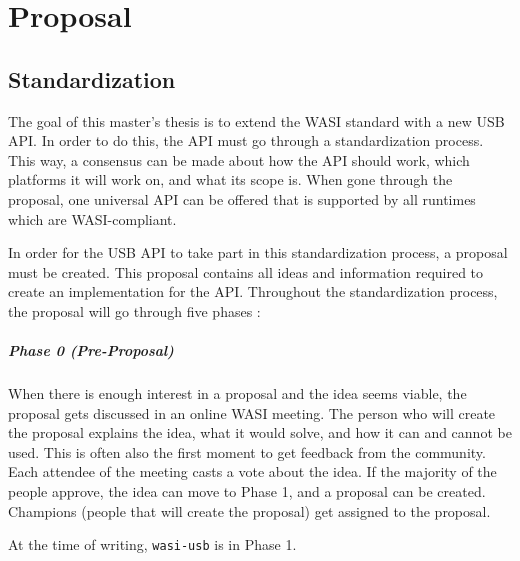 \chapter{Proposal}

\section{Standardization}
The goal of this master's thesis is to extend the \acrshort{WASI} standard with a new \acrshort{USB} \acrshort{API}. In order to do this, the \acrshort{API} must go through a standardization process. This way, a consensus can be made about how the \acrshort{API} should work, which platforms it will work on, and what its scope is. When gone through the proposal, one universal \acrshort{API} can be offered that is supported by all runtimes which are \acrshort{WASI}-compliant.

In order for the \acrshort{USB} \acrshort{API} to take part in this standardization process, a proposal must be created. This proposal contains all ideas and information required to create an implementation for the \acrshort{API}. Throughout the standardization process, the proposal will go through five phases \cite{proposal_phases}:

\paragraph{Phase 0 (Pre-Proposal)}
When there is enough interest in a proposal and the idea seems viable, the proposal gets discussed in an online WASI meeting. The person who will create the proposal explains the idea, what it would solve, and how it can and cannot be used. This is often also the first moment to get feedback from the community. Each attendee of the meeting casts a vote about the idea. If the majority of the people approve, the idea can move to Phase 1, and a proposal can be created. Champions (people that will create the proposal) get assigned to the proposal.

At the time of writing, \texttt{wasi-usb} is in Phase 1.

